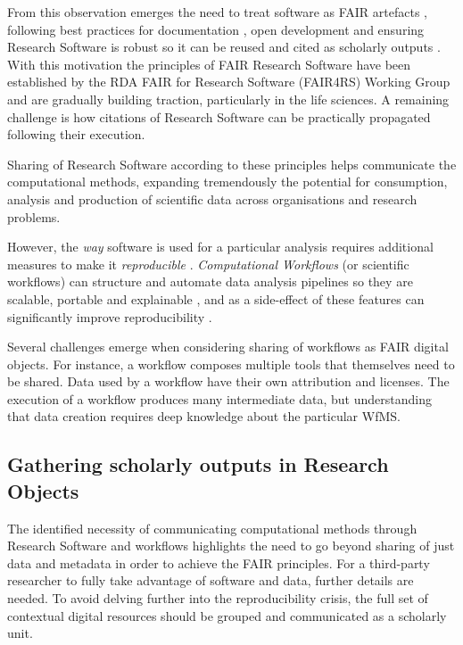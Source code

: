 From this observation emerges the need to treat software as FAIR artefacts \cite{Lamprecht 2019}, following best practices for documentation \cite{Lee 2018}, open development \cite{Prlić 2012} and ensuring Research Software is robust \cite{Taschuk 2017} so it can be reused and cited as scholarly outputs \cite{Smith 2016}. 
With this motivation the principles of FAIR Research Software \cite{Katz 2021b} have been established by the RDA FAIR for Research Software (FAIR4RS) Working Group \cite{Barker 2022} and are gradually building traction, particularly in the life sciences.
A remaining challenge is how citations of Research Software can be practically propagated following their execution. 

Sharing of Research Software according to these principles helps communicate the computational methods, expanding tremendously the potential for consumption, analysis and production of scientific data across organisations and research problems.

However, the \emph{way} software is used for a particular analysis requires additional measures to make it \emph{reproducible} \cite{Stodden 2016,Sandve 2013}. \emph{Computational Workflows} (or \glspl{scientific workflow}) can structure and automate data analysis pipelines so they are scalable, portable and explainable \cite{Atkinson 2017}, and as a side-effect of these features can significantly improve reproducibility \cite{Cohen-Boulakia 2017}. 

Several challenges emerge when considering sharing of workflows as FAIR digital objects. For instance, a workflow composes multiple tools that themselves need to be shared. Data used by a workflow have their own attribution and licenses. The execution of a workflow produces many intermediate data, but understanding that data creation requires deep knowledge about the particular \acrfull{WfMS}.



\subsection{Gathering scholarly outputs in Research Objects}

The identified necessity of communicating computational methods through Research Software and workflows highlights the need to go beyond sharing of just data and metadata in order to achieve the FAIR principles. For a third-party researcher to fully take advantage of software and data, further details are needed. To avoid delving further into the reproducibility crisis, the full set of contextual digital resources should be grouped and communicated as a scholarly unit.

